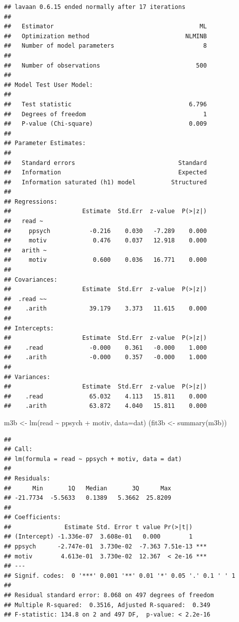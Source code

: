 \documentclass[
]{article}
\newenvironment{Shaded}{\begin{snugshade}}{\end{snugshade}}
\newcommand{\AttributeTok}[1]{\textcolor[rgb]{0.77,0.63,0.00}{#1}}
\newcommand{\FunctionTok}[1]{\textcolor[rgb]{0.00,0.00,0.00}{#1}}
\newcommand{\NormalTok}[1]{#1}
\newcommand{\OtherTok}[1]{\textcolor[rgb]{0.56,0.35,0.01}{#1}}
\newcommand{\SpecialCharTok}[1]{\textcolor[rgb]{0.00,0.00,0.00}{#1}}
\begin{document}
\begin{verbatim}
## lavaan 0.6.15 ended normally after 17 iterations
## 
##   Estimator                                         ML
##   Optimization method                           NLMINB
##   Number of model parameters                         8
## 
##   Number of observations                           500
## 
## Model Test User Model:
##                                                       
##   Test statistic                                 6.796
##   Degrees of freedom                                 1
##   P-value (Chi-square)                           0.009
## 
## Parameter Estimates:
## 
##   Standard errors                             Standard
##   Information                                 Expected
##   Information saturated (h1) model          Structured
## 
## Regressions:
##                    Estimate  Std.Err  z-value  P(>|z|)
##   read ~                                              
##     ppsych           -0.216    0.030   -7.289    0.000
##     motiv             0.476    0.037   12.918    0.000
##   arith ~                                             
##     motiv             0.600    0.036   16.771    0.000
## 
## Covariances:
##                    Estimate  Std.Err  z-value  P(>|z|)
##  .read ~~                                             
##    .arith            39.179    3.373   11.615    0.000
## 
## Intercepts:
##                    Estimate  Std.Err  z-value  P(>|z|)
##    .read             -0.000    0.361   -0.000    1.000
##    .arith            -0.000    0.357   -0.000    1.000
## 
## Variances:
##                    Estimate  Std.Err  z-value  P(>|z|)
##    .read             65.032    4.113   15.811    0.000
##    .arith            63.872    4.040   15.811    0.000
\end{verbatim}

\begin{Shaded}
\begin{Highlighting}[]
\NormalTok{m3b }\OtherTok{\textless{}{-}} \FunctionTok{lm}\NormalTok{(read }\SpecialCharTok{\textasciitilde{}}\NormalTok{ ppsych }\SpecialCharTok{+}\NormalTok{ motiv, }\AttributeTok{data=}\NormalTok{dat)}
\NormalTok{(fit3b }\OtherTok{\textless{}{-}} \FunctionTok{summary}\NormalTok{(m3b))}
\end{Highlighting}
\end{Shaded}

\begin{verbatim}
## 
## Call:
## lm(formula = read ~ ppsych + motiv, data = dat)
## 
## Residuals:
##      Min       1Q   Median       3Q      Max 
## -21.7734  -5.5633   0.1389   5.3662  25.8209 
## 
## Coefficients:
##               Estimate Std. Error t value Pr(>|t|)    
## (Intercept) -1.336e-07  3.608e-01   0.000        1    
## ppsych      -2.747e-01  3.730e-02  -7.363 7.51e-13 ***
## motiv        4.613e-01  3.730e-02  12.367  < 2e-16 ***
## ---
## Signif. codes:  0 '***' 0.001 '**' 0.01 '*' 0.05 '.' 0.1 ' ' 1
## 
## Residual standard error: 8.068 on 497 degrees of freedom
## Multiple R-squared:  0.3516, Adjusted R-squared:  0.349 
## F-statistic: 134.8 on 2 and 497 DF,  p-value: < 2.2e-16
\end{verbatim}
\end{document}
